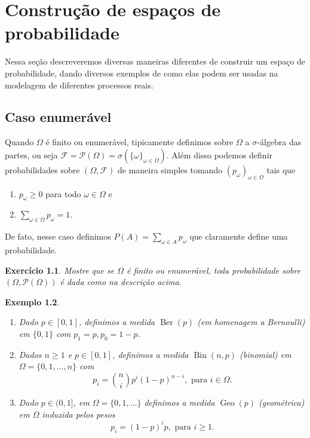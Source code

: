\documentclass[reqno, final]{book}
\newcommand*\1{\mathds{1}}
\newtheorem{example}{Exemplo}[section]
\newtheorem{exercise}[example]{Exercício}
\DeclareMathOperator{\Ber}{Ber}
\DeclareMathOperator{\Geo}{Geo}
\DeclareMathOperator{\Bin}{Bin}
\begin{document}
\chapter{Construção de espaços de probabilidade}

Nessa seção descreveremos diversas maneiras diferentes de construir um espaço de probabilidade, dando diversos exemplos de como elas podem ser usadas na modelagem de diferentes processos reais.

\section{Caso enumerável}

Quando $\Omega$ é finito ou enumerável, tipicamente definimos sobre $\Omega$ a $\sigma$-álgebra das partes, ou seja $\mathcal{F} = \mathcal{P}(\Omega) = \sigma(\{\omega\}_{\omega \in \Omega})$.
Além disso podemos definir probabilidades sobre $(\Omega, \mathcal{F})$ de maneira simples tomando $(p_\omega)_{\omega \in \Omega}$ tais que
\begin{enumerate}[\quad a)]
\item $p_\omega \geq 0$ para todo $\omega \in \Omega$ e
\item $\sum_{\omega \in \Omega} p_\omega = 1$.
\end{enumerate}
De fato, nesse caso definimos $P(A) = \sum_{\omega \in A} p_\omega$ que claramente define uma probabilidade.

\begin{exercise}
  Mostre que se $\Omega$ é finito ou enumerável, toda probabilidade sobre $(\Omega, \mathcal{P}(\Omega))$ é dada como na descrição acima.
\end{exercise}

\begin{example} \mbox{}
  \begin{enumerate}[\quad a)]
  \item Dado $p \in [0,1]$, definimos a medida $\Ber(p)$  (em homenagem a Bernoulli) em $\{0,1\}$ com $p_1 = p, p_0 = 1-p$.
  \item Dados $n \geq 1$ e $p \in [0,1]$, definimos a medida $\Bin(n,p)$  (binomial) em $\Omega = \{0, 1, \dots, n\}$ com
    \begin{equation}
      p_i = \binom ni p^i (1-p)^{n-i}, \text{ para $i \in \Omega$.}
    \end{equation}
  \item Dado $p \in (0,1]$, em $\Omega = \{0, 1, \dots\}$ definimos a medida $\Geo(p)$  (geométrica) em $\Omega$ induzida pelos pesos
  \begin{equation}
    p_i = (1-p)^i p, \text{ para $i \geq 1$.}
  \end{equation}
  \end{enumerate}
\end{example}
\end{document}
